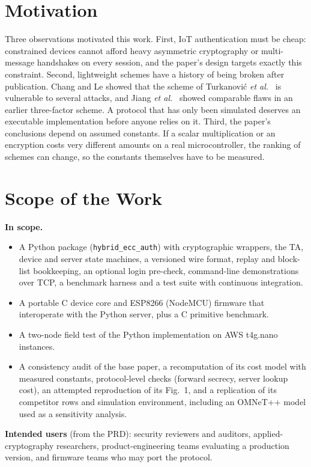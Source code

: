 \documentclass[12pt,a4paper,oneside]{report}
\numberwithin{equation}{chapter}
\begin{document}
\section{Motivation}
Three observations motivated this work. First, IoT authentication must be cheap: constrained devices cannot afford heavy asymmetric cryptography or multi-message handshakes on every session, and the paper's design targets exactly this constraint. Second, lightweight schemes have a history of being broken after publication. Chang and Le \cite{chang2016provably} showed that the scheme of Turkanovi\'{c} \emph{et al.}\ \cite{turkanovic2014novel} is vulnerable to several attacks, and Jiang \emph{et al.}\ \cite{jiang2016robust} showed comparable flaws in an earlier three-factor scheme. A protocol that has only been simulated deserves an executable implementation before anyone relies on it. Third, the paper's conclusions depend on assumed constants. If a scalar multiplication or an encryption costs very different amounts on a real microcontroller, the ranking of schemes can change, so the constants themselves have to be measured.

\section{Scope of the Work}
\textbf{In scope.}
\begin{itemize}[nosep]
  \item A Python package (\texttt{hybrid\_ecc\_auth}) with cryptographic wrappers, the TA, device and server state machines, a versioned wire format, replay and block-list bookkeeping, an optional login pre-check, command-line demonstrations over TCP, a benchmark harness and a test suite with continuous integration.
  \item A portable C device core and ESP8266 (NodeMCU) firmware that interoperate with the Python server, plus a C primitive benchmark.
  \item A two-node field test of the Python implementation on AWS t4g.nano instances.
  \item A consistency audit of the base paper, a recomputation of its cost model with measured constants, protocol-level checks (forward secrecy, server lookup cost), an attempted reproduction of its Fig.~1, and a replication of its competitor rows and simulation environment, including an OMNeT++ model used as a sensitivity analysis.
\end{itemize}

\textbf{Intended users} (from the PRD): security reviewers and auditors, applied-cryptography researchers, product-engineering teams evaluating a production version, and firmware teams who may port the protocol.
\end{document}
